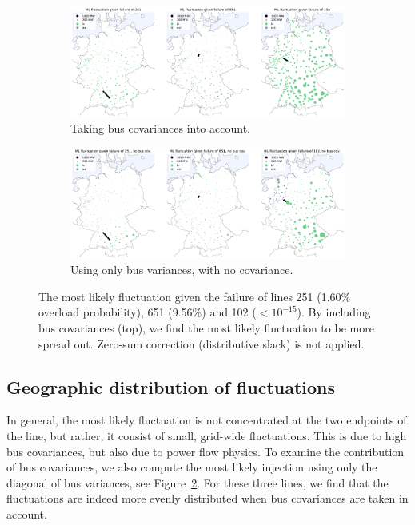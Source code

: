 \documentclass[main.tex]{subfiles}
\begin{document}
\begin{figure}[ht]
\begin{subfigure}{\textwidth}
    \centering
    \includegraphics[width=\textwidth]{img/ML_fluctuation_with_bus_cov.pdf}
    \caption{Taking bus covariances into account.}\label{fig:MLfluctuation1}
\end{subfigure}
\begin{subfigure}{\textwidth}
    \centering
    \includegraphics[width=\textwidth]{img/ML_fluctuation_without_bus_cov.pdf}
    \caption{Using only bus variances, with no covariance.}\label{fig:MLfluctuation2}
\end{subfigure}
    \caption{The most likely fluctuation given the failure of lines 251 (1.60\% overload probability), 651 (9.56\%) and 102 ($< 10^{-15}$). By including bus covariances (top), we find the most likely fluctuation to be more spread out. Zero-sum correction (distributive slack) is not applied.}\label{fig:MLfluctuation}
\end{figure}

\subsection{Geographic distribution of fluctuations}
In general, the most likely fluctuation is not concentrated at the two endpoints of the line, but rather, it consist of small, grid-wide fluctuations. This is due to high bus covariances, but also due to power flow physics. To examine the contribution of bus covariances, we also compute the most likely injection using only the diagonal of bus variances, see Figure~\ref{fig:MLfluctuation2}. For these three lines, we find that the fluctuations are indeed more evenly distributed when bus covariances are taken in account. 
\end{document}
